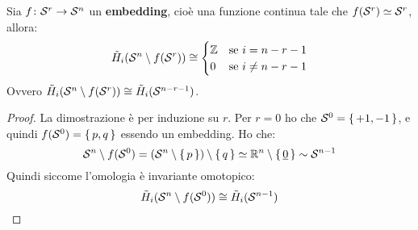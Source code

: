 \begin{theorem}
  Sia $ f \colon \mathcal{S}^{r} \to \mathcal{S}^{n} $ un \textbf{embedding}, cioè una funzione
  continua tale che $ f(\mathcal{S}^{r}) \simeq \mathcal{S}^{r} $, allora:
  \[
    \tilde{H}_i(\mathcal{S}^{n} \setminus f(\mathcal{S}^{r})) \cong
    \begin{cases}
      \mathbb{Z} & \text{se } i = n - r - 1 \\
      0 & \text{se }  i \not = n - r - 1
    \end{cases}
  \]
  Ovvero $ \tilde{H}_i(\mathcal{S}^{n} \setminus f(\mathcal{S}^{r})) \cong \tilde{H}_i(\mathcal{S}^{n - r - 1}) $.
\end{theorem}
\begin{proof}
  La dimostrazione è per induzione su $ r $. Per $ r = 0 $ ho che
  $ \mathcal{S}^{0} = \set{+1,-1} $, e quindi $ f(\mathcal{S}^{0}) = \set{p,q} $ essendo un
  embedding. Ho che:
  \[
     \mathcal{S}^{n} \setminus f(\mathcal{S}^{0}) = (\mathcal{S}^{n} \setminus \set{p}) \setminus \set{q} \simeq \mathbb{R}^{n} \setminus \set{\underline{0}} \sim \mathcal{S}^{n-1}
  \]
  Quindi siccome l'omologia è invariante omotopico:
  \[
    \tilde{H}_i(\mathcal{S}^{n} \setminus f(\mathcal{S}^{0})) \cong \tilde{H}_i(\mathcal{S}^{n - 1})
  \]


\end{proof}
